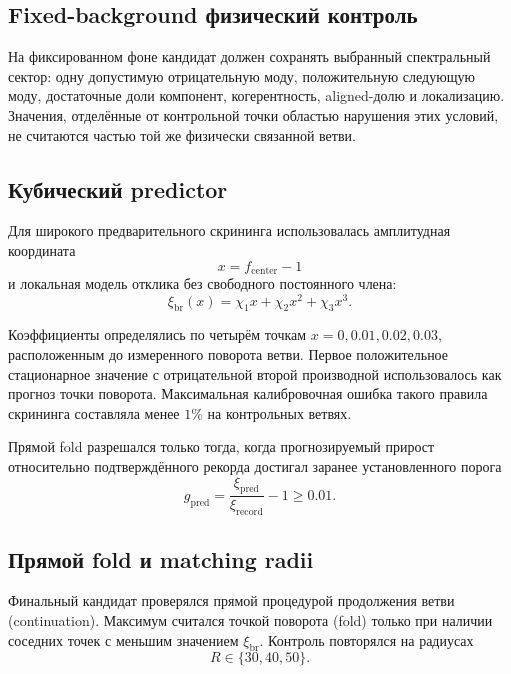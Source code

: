 \documentclass[11pt,a4paper]{article}
\begin{document}
\subsection{Fixed-background физический контроль}

На фиксированном фоне кандидат должен сохранять выбранный спектральный сектор: одну допустимую отрицательную моду, положительную следующую моду, достаточные доли компонент, когерентность, aligned-долю и локализацию. Значения, отделённые от контрольной точки областью нарушения этих условий, не считаются частью той же физически связанной ветви.

\subsection{Кубический predictor}

Для широкого предварительного скрининга использовалась амплитудная координата
\begin{equation}
x=f_{\mathrm{center}}-1
\end{equation}
и локальная модель отклика без свободного постоянного члена:
\begin{equation}
\xi_{\mathrm{br}}(x)
=\chi_1x+\chi_2x^2+\chi_3x^3.
\label{eq:cubic_predictor}
\end{equation}

Коэффициенты определялись по четырём точкам $x=0,0.01,0.02,0.03$, расположенным до измеренного поворота ветви. Первое положительное стационарное значение с отрицательной второй производной использовалось как прогноз точки поворота. Максимальная калибровочная ошибка такого правила скрининга составляла менее $1\%$ на контрольных ветвях.

Прямой fold разрешался только тогда, когда прогнозируемый прирост относительно подтверждённого рекорда достигал заранее установленного порога
\begin{equation}
g_{\mathrm{pred}}
=\frac{\xi_{\mathrm{pred}}}{\xi_{\mathrm{record}}}-1
\geq 0.01.
\label{eq:one_percent_gate}
\end{equation}

\subsection{Прямой fold и matching radii}

Финальный кандидат проверялся прямой процедурой продолжения ветви (continuation). Максимум считался точкой поворота (fold) только при наличии соседних точек с меньшим значением $\xi_{\mathrm{br}}$. Контроль повторялся на радиусах
\begin{equation}
R\in\{30,40,50\}.
\end{equation}
\end{document}
